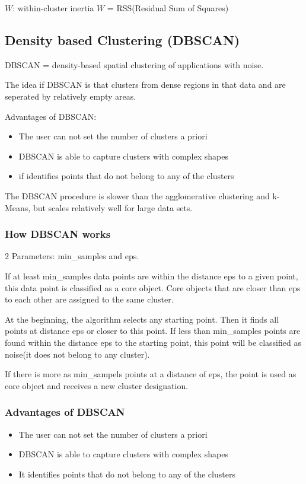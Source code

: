 \(W\): within-cluster inertia \(W\) = RSS(Residual Sum of Squares)

\subsection{Density based Clustering (DBSCAN)}
DBSCAN = density-based spatial clustering of applications with noise.

The idea if DBSCAN is that clusters from dense regions in that data and are seperated by relatively empty areas.

Advantages of DBSCAN:
\begin{itemize}
    \item The user can not set the number of clusters a priori
    \item DBSCAN is able to capture clusters with complex shapes
    \item if identifies points that do not belong to any of the clusters
\end{itemize}
The DBSCAN procedure is slower than the agglomerative clustering and k-Means, but scales relatively well for large data sets.
\subsubsection{How DBSCAN works}
2 Parameters: min\_samples and eps.

If at least min\_samples data points are within the distance eps to a given point, this data point is classified as a core object.
Core objects that are closer than eps to each other are assigned to the same cluster.

At the beginning, the algorithm selects any starting point.
Then it finds all points at distance eps or closer to this point.
If less than min\_samples points are found within the distance eps to the starting point, this point will be classified as noise(it does not belong to any cluster).

If there is more as min\_sampels points at a distance of eps, the point is used as core object and receives a new cluster designation.

\subsubsection{Advantages of DBSCAN}
\begin{itemize}
    \item The user can not set the number of clusters a priori
    \item DBSCAN is able to capture clusters with complex shapes
    \item It identifies points that do not belong to any of the clusters
\end{itemize}
